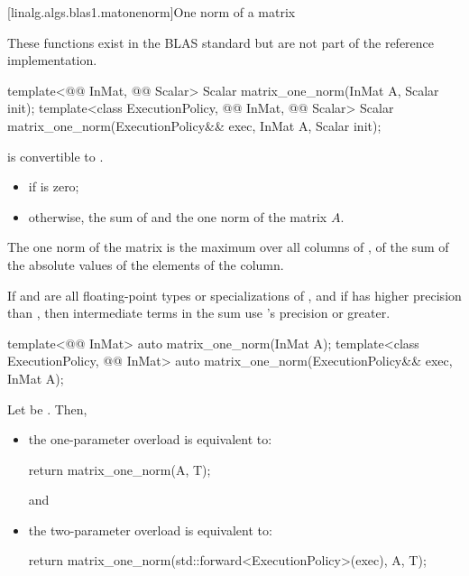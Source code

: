 [linalg.algs.blas1.matonenorm]{One norm of a matrix}

\pnum
\begin{note}
These functions exist in the BLAS standard\supercite{blas-std}
but are not part of the reference implementation.
\end{note}

%
\begin{itemdecl}
template<@@ InMat, @@ Scalar>
  Scalar matrix_one_norm(InMat A, Scalar init);
template<class ExecutionPolicy, @@ InMat, @@ Scalar>
  Scalar matrix_one_norm(ExecutionPolicy&& exec, InMat A, Scalar init);
\end{itemdecl}

\begin{itemdescr}
\pnum
\mandates
{}
is convertible to .

\pnum
\returns
\begin{itemize}
\item
{} if  is zero;
\item
otherwise, the sum of  and the one norm of the matrix $A$.
\end{itemize}
\begin{note}
The one norm of the matrix 
is the maximum over all columns of ,
of the sum of the absolute values of the elements of the column.
\end{note}

\pnum
\remarks
If  and 
are all floating-point types or specializations of ,
and if  has higher precision
than ,
then intermediate terms in the sum use 's precision or greater.
\end{itemdescr}

%
\begin{itemdecl}
template<@@ InMat>
  auto matrix_one_norm(InMat A);
template<class ExecutionPolicy, @@ InMat>
  auto matrix_one_norm(ExecutionPolicy&& exec, InMat A);
\end{itemdecl}

\begin{itemdescr}
\pnum
\effects
Let  be
.
Then,
\begin{itemize}
\item
the one-parameter overload is equivalent to:
\begin{codeblock}
return matrix_one_norm(A, T{});
\end{codeblock}
and
\item
the two-parameter overload is equivalent to:
\begin{codeblock}
return matrix_one_norm(std::forward<ExecutionPolicy>(exec), A, T{});
\end{codeblock}
\end{itemize}
\end{itemdescr}

